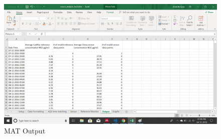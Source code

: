 \documentclass[12pt,a4paper,oneside]{report}
\begin{document}
\begin{figure}[h]
    \begin{center}
    \includegraphics[scale=0.35]{images/figure6.png}
    \end{center}
    \caption{MAT Output}
    \label{MAT}
  \end{figure}



\end{document}
